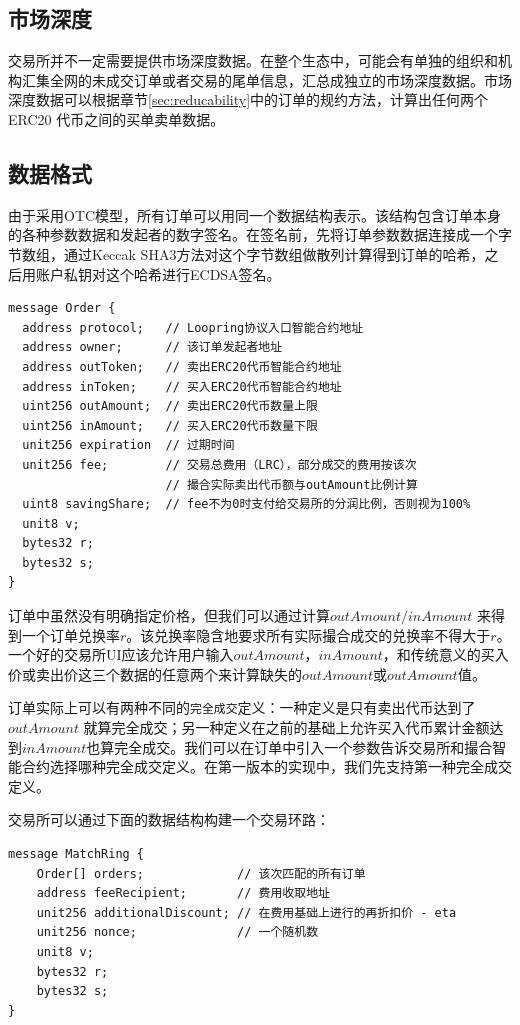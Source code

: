 \documentclass[UTF8,nofonts]{ctexart}
\begin{document}
\subsection{市场深度\label{sec:marketdepth}}

交易所并不一定需要提供市场深度数据。在整个生态中，可能会有单独的组织和机构汇集全网的未成交订单或者交易的尾单信息，汇总成独立的市场深度数据。市场深度数据可以根据章节\ref{sec:reducability}中的订单的规约方法，计算出任何两个ERC20 代币之间的买单卖单数据。

\subsection{数据格式\label{sec:dataformat}}

由于采用OTC模型，所有订单可以用同一个数据结构表示。该结构包含订单本身的各种参数数据和发起者的数字签名。在签名前，先将订单参数数据连接成一个字节数组，通过Keccak SHA3方法对这个字节数组做散列计算得到订单的哈希，之后用账户私钥对这个哈希进行ECDSA签名。


\begin{verbatim}
message Order {
  address protocol;   // Loopring协议入口智能合约地址
  address owner;      // 该订单发起者地址
  address outToken;   // 卖出ERC20代币智能合约地址
  address inToken;    // 买入ERC20代币智能合约地址
  uint256 outAmount;  // 卖出ERC20代币数量上限
  uint256 inAmount;   // 买入ERC20代币数量下限
  unit256 expiration  // 过期时间
  unit256 fee;        // 交易总费用（LRC），部分成交的费用按该次
                      // 撮合实际卖出代币额与outAmount比例计算
  uint8 savingShare;  // fee不为0时支付给交易所的分润比例，否则视为100%
  unit8 v;
  bytes32 r;
  bytes32 s;
}
\end{verbatim}

订单中虽然没有明确指定价格，但我们可以通过计算$outAmount / inAmount$ 来得到一个订单兑换率$r$。该兑换率隐含地要求所有实际撮合成交的兑换率不得大于$r$。 一个好的交易所UI应该允许用户输入$outAmount$，$inAmount$，和传统意义的买入价或卖出价这三个数据的任意两个来计算缺失的$outAmount$或$outAmount$值。

订单实际上可以有两种不同的\texttt{完全成交}定义：一种定义是只有卖出代币达到了$outAmount$ 就算完全成交；另一种定义在之前的基础上允许买入代币累计金额达到$inAmount$也算完全成交。我们可以在订单中引入一个参数告诉交易所和撮合智能合约选择哪种完全成交定义。在第一版本的实现中，我们先支持第一种完全成交定义。


交易所可以通过下面的数据结构构建一个交易环路：
\begin{verbatim}
message MatchRing {
    Order[] orders;             // 该次匹配的所有订单
    address feeRecipient;       // 费用收取地址
    unit256 additionalDiscount; // 在费用基础上进行的再折扣价 - eta
    unit256 nonce;              // 一个随机数
    unit8 v;
    bytes32 r;
    bytes32 s;
}
\end{verbatim}
\end{document}
